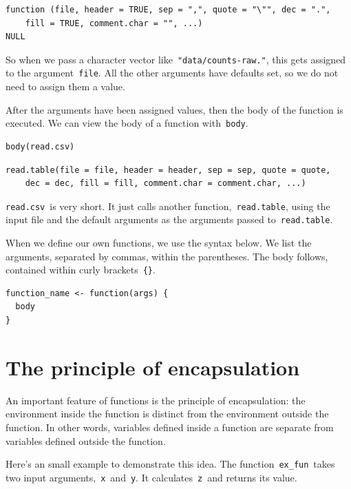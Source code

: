 \documentclass[
]{book}
\begin{document}
\begin{verbatim}
function (file, header = TRUE, sep = ",", quote = "\"", dec = ".", 
    fill = TRUE, comment.char = "", ...) 
NULL
\end{verbatim}

So when we pass a character vector like~\texttt{"data/counts-raw."}, this gets assigned to the argument~\texttt{file}. All the other arguments have defaults set, so we do not need to assign them a value.

After the arguments have been assigned values, then the body of the function is executed. We can view the body of a function with~\texttt{body}.

\begin{verbatim}
body(read.csv)
\end{verbatim}

\begin{verbatim}
read.table(file = file, header = header, sep = sep, quote = quote,
    dec = dec, fill = fill, comment.char = comment.char, ...)
\end{verbatim}

\texttt{read.csv}~is very short. It just calls another function,~\texttt{read.table}, using the input file and the default arguments as the arguments passed to~\texttt{read.table}.

When we define our own functions, we use the syntax below. We list the arguments, separated by commas, within the parentheses. The body follows, contained within curly brackets~\texttt{\{\}}.

\begin{verbatim}
function_name <- function(args) {
  body
}
\end{verbatim}

\hypertarget{the-principle-of-encapsulation}{%
\section{The principle of encapsulation}\label{the-principle-of-encapsulation}}

An important feature of functions is the principle of encapsulation: the environment inside the function is distinct from the environment outside the function. In other words, variables defined inside a function are separate from variables defined outside the function.

Here's an small example to demonstrate this idea. The function~\texttt{ex\_fun}~takes two input arguments,~\texttt{x}~and~\texttt{y}. It calculates~\texttt{z}~and returns its value.
\end{document}
